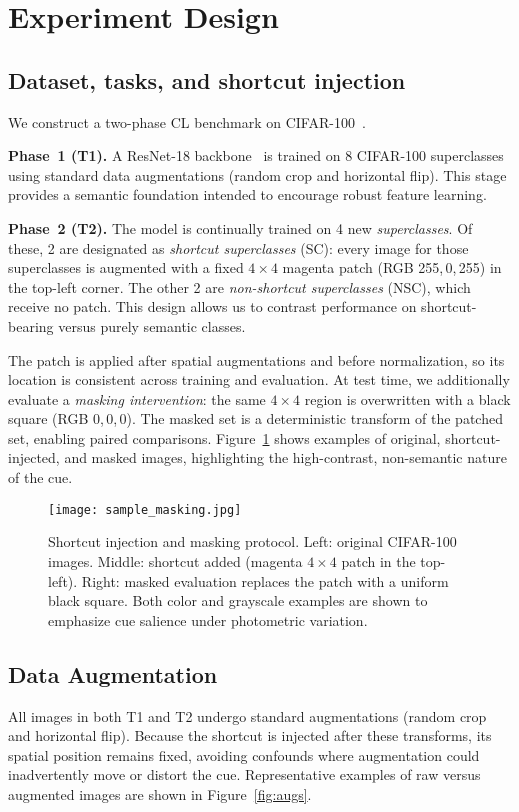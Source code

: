 \documentclass[conference]{IEEEtran}
\begin{document}
\section{Experiment Design}

\subsection{Dataset, tasks, and shortcut injection}
We construct a two-phase CL benchmark on CIFAR-100~\cite{Krizhevsky2009LearningML}. 

\textbf{Phase~1 (T1).} A ResNet-18 backbone~\cite{DBLP:journals/corr/HeZRS15} is trained on 8 CIFAR-100 superclasses using standard data augmentations (random crop and horizontal flip). This stage provides a semantic foundation intended to encourage robust feature learning.

\textbf{Phase~2 (T2).} The model is continually trained on 4 new \emph{superclasses}. Of these, 2 are designated as \emph{shortcut superclasses} (SC): every image for those superclasses is augmented with a fixed \(4\times4\) magenta patch (RGB 255,\,0,\,255) in the top-left corner. The other 2 are \emph{non-shortcut superclasses} (NSC), which receive no patch. This design allows us to contrast performance on shortcut-bearing versus purely semantic classes.

The patch is applied after spatial augmentations and before normalization, so its location is consistent across training and evaluation. At test time, we additionally evaluate a \emph{masking intervention}: the same \(4\times4\) region is overwritten with a black square (RGB 0,\,0,\,0). The masked set is a deterministic transform of the patched set, enabling paired comparisons. Figure~\ref{fig:samples} shows examples of original, shortcut-injected, and masked images, highlighting the high-contrast, non-semantic nature of the cue.

\begin{figure}[htbp]
 \centering
 \texttt{[image: sample\_masking.jpg]}
 \caption{Shortcut injection and masking protocol. Left: original CIFAR-100 images. Middle: shortcut added (magenta \(4\times4\) patch in the top-left). Right: masked evaluation replaces the patch with a uniform black square. Both color and grayscale examples are shown to emphasize cue salience under photometric variation.}
 \label{fig:samples}
\end{figure}

\subsection{Data Augmentation}
All images in both T1 and T2 undergo standard augmentations (random crop and horizontal flip). Because the shortcut is injected after these transforms, its spatial position remains fixed, avoiding confounds where augmentation could inadvertently move or distort the cue. Representative examples of raw versus augmented images are shown in Figure~\ref{fig:augs}.
\end{document}
